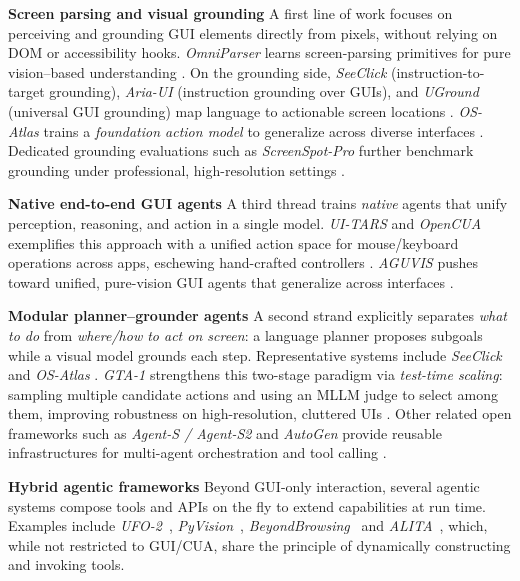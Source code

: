 \documentclass{article} %
\begin{document}
\textbf{Screen parsing and visual grounding} A first line of work focuses on perceiving and grounding GUI elements directly from pixels, without relying on DOM or accessibility hooks. \textit{OmniParser} learns screen-parsing primitives for pure vision–based understanding \citep{lu2024omniparser}. On the grounding side, \textit{SeeClick} (instruction-to-target grounding), \textit{Aria-UI} (instruction grounding over GUIs), and \textit{UGround} (universal GUI grounding) map language to actionable screen locations \citep{cheng2024seeclick,yang2024aria,gou2024uground}. \textit{OS-Atlas} trains a \emph{foundation action model} to generalize across diverse interfaces \citep{wu2024atlas}. Dedicated grounding evaluations such as \textit{ScreenSpot-Pro} further benchmark grounding under professional, high-resolution settings \citep{li2025screenspotpro}.

\textbf{Native end-to-end GUI agents}
A third thread trains \emph{native} agents that unify perception, reasoning, and action in a single model. \textit{UI-TARS} and \textit{OpenCUA} exemplifies this approach with a unified action space for mouse/keyboard operations across apps, eschewing hand-crafted controllers \citep{qin2025ui, wang2025ui, wang2025opencua}. \textit{AGUVIS} pushes toward unified, pure-vision GUI agents that generalize across interfaces \citep{xu2024aguvis}.

\textbf{Modular planner–grounder agents}
A second strand explicitly separates \emph{what to do} from \emph{where/how to act on screen}: a language planner proposes subgoals while a visual model grounds each step. Representative systems include \textit{SeeClick} and \textit{OS-Atlas} \citep{cheng2024seeclick,wu2024atlas}. \textit{GTA-1} strengthens this two-stage paradigm via \emph{test-time scaling}: sampling multiple candidate actions and using an MLLM judge to select among them, improving robustness on high-resolution, cluttered UIs \citep{yang2025gta1guitesttimescaling}. Other related open frameworks such as \textit{Agent-S / Agent-S2} and \textit{AutoGen} provide reusable infrastructures for multi-agent orchestration and tool calling \citep{agashe2024agent,agashe2025agent, song2025adaptiveinconversationteambuilding, zhang2024offlinetraininglanguagemodel,wu2023autogenenablingnextgenllm, zhang2023ecoassistantusingllmassistant,zhang2025agentcausestaskfailures}.

\textbf{Hybrid agentic frameworks}
Beyond GUI-only interaction, several agentic systems compose tools and APIs on the fly to extend capabilities at run time. Examples include \textit{UFO-2}~\citep{zhang2025ufo2desktopagentos}, \textit{PyVision}~\citep{zhao2025pyvisionagenticvisiondynamic}, \textit{BeyondBrowsing}~\citep{song2025browsingapibasedwebagents} and \textit{ALITA}~\citep{qiu2025alitageneralistagentenabling}, which, while not restricted to GUI/CUA, share the principle of dynamically constructing and invoking tools. 
\end{document}

